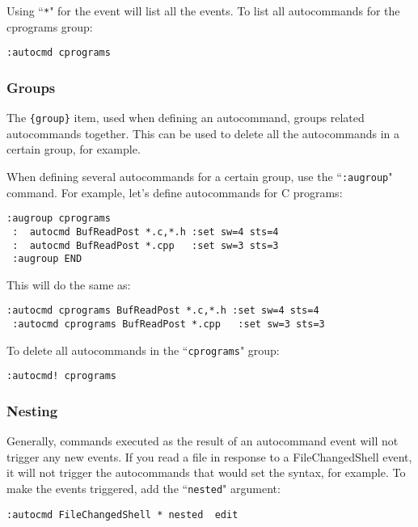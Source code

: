 Using ``\texttt{*}" for the event will list all the events.
To list all autocommands for the cprograms group:

\begin{Verbatim}[samepage=true]
 :autocmd cprograms
\end{Verbatim}

\subsubsection{Groups}
The \texttt{\{group\}} item, used when defining an autocommand, groups related autocommands together.
This can be used to delete all the autocommands in a certain group, for example.

When defining several autocommands for a certain group, use the ``\texttt{:augroup}" command.
For example, let's define autocommands for C programs:

\begin{Verbatim}[samepage=true]
 :augroup cprograms
 :  autocmd BufReadPost *.c,*.h :set sw=4 sts=4
 :  autocmd BufReadPost *.cpp   :set sw=3 sts=3
 :augroup END
\end{Verbatim}

This will do the same as:

\begin{Verbatim}[samepage=true]
 :autocmd cprograms BufReadPost *.c,*.h :set sw=4 sts=4
 :autocmd cprograms BufReadPost *.cpp   :set sw=3 sts=3
\end{Verbatim}

To delete all autocommands in the ``\texttt{cprograms}" group:

\begin{Verbatim}[samepage=true]
 :autocmd! cprograms
\end{Verbatim}

\subsubsection{Nesting}
Generally, commands executed as the result of an autocommand event will not trigger any new events.
If you read a file in response to a FileChangedShell event, it will not trigger the autocommands that would set the syntax, for example.
To make the events triggered, add the ``\texttt{nested}" argument:

\begin{Verbatim}[samepage=true]
 :autocmd FileChangedShell * nested  edit
\end{Verbatim}

